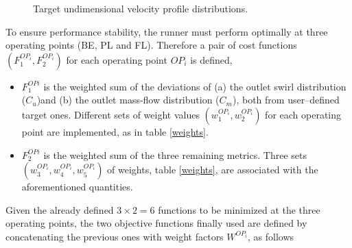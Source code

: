 \begin{figure}[h!]
\begin{minipage}[b]{1\linewidth}
 \centering
\end{minipage}
\caption{Target undimensional velocity profile distributions.}
\label{design-obj-tar-Matrix}
\end{figure}

To ensure performance stability, the runner must perform optimally at three operating points (BE, PL and FL). Therefore a pair of cost functions $(F_1^{OP_i},F_2^{OP_i})$ for each operating point $OP_i$ is defined,

\begin{itemize}
\item $F_1^{OPi}$ is the weighted sum of the deviations of (a) the outlet swirl distribution ($C_u$)and (b) the outlet mass-flow distribution ($C_m$), both from user--defined target ones. Different sets of weight values $(w_1^{OP_i}, w_2^{OP_i})$ for each operating point are implemented, as in table \ref{weights}.
    	
\item $F_2^{OPi}$ is the weighted sum of the three remaining metrics. Three sets $(w_3^{OP_i}, w_4^{OP_i},w_5^{OP_i})$ of weights, table \ref{weights}, are associated with the aforementioned quantities. 
\end{itemize}

Given the already defined $3\!\times\!2\!=\!6$ functions to be minimized at the three operating points, the two objective functions finally used are defined by concatenating the previous ones with weight factors \(W^{OP_i}\), as follows

